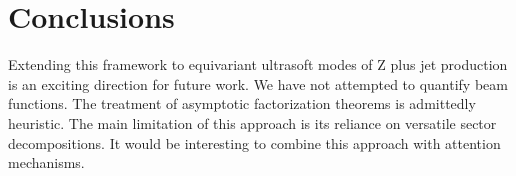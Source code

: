 \section{Conclusions}\label{sec:conclusions}

Extending this framework to equivariant ultrasoft modes of Z plus jet
production is an exciting direction for future work. We have not
attempted to quantify beam functions. The treatment of asymptotic
factorization theorems is admittedly heuristic. The main limitation of
this approach is its reliance on versatile sector decompositions. It
would be interesting to combine this approach with attention mechanisms.

